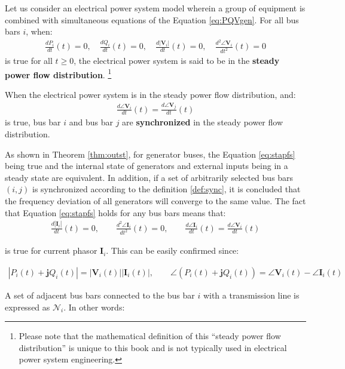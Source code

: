 \documentclass[graybox, envcountchap]{svmult}
\begin{document}
\begin{definition}
\label{def:sync}
Let us consider an electrical power system model wherein a group of equipment is combined with simultaneous equations of the Equation \ref{eq:PQVgen}.
For all bus bars $i$, when:
\begin{align}\label{eq:stapfs}
\frac{dP_i}{dt}(t)=0
,\quad
\frac{dQ_i}{dt}(t)=0
,\quad
\frac{d|\bm{V}_i|}{dt}(t)=0
,\quad
\frac{d^2 \angle \bm{V}_i }{dt^2}(t)=0
\end{align}
is true for all $t\geq0$, the electrical power system is said to be in the \textbf{steady power flow distribution}.
\footnote{
Please note that the mathematical definition of this “steady power flow distribution” is unique to this book and is not typically used in electrical power system engineering.
}

When the electrical power system is in the steady power flow distribution, and:
\begin{align}\label{eq:defsyn}
\frac{d \angle \bm{V}_i}{dt}(t) =  \frac{d \angle \bm{V}_j}{dt}(t)
\end{align}
is true, bus bar $i$ and bus bar $j$ are \textbf{synchronized} in the steady power flow distribution.
\end{definition}

As shown in Theorem \ref{thm:outst}, for generator buses, the Equation \ref{eq:stapfs} being true and the internal state of generators and external inputs being in a steady state are equivalent.
In addition, if a set of arbitrarily selected bus bars $(i,j)$ is synchronized according to the definition \ref{def:sync}, it is concluded that the frequency deviation of all generators will converge to the same value.
The fact that Equation \ref{eq:stapfs} holds for any bus bars means that:
\begin{align*}
\frac{d|\bm{I}_i|}{dt}(t)=0
,\qquad
\frac{d^2 \angle \bm{I}_i }{dt^2}(t)=0
,\qquad
\frac{d \angle \bm{I}_i }{dt}(t) = \frac{d \angle \bm{V}_i }{dt} (t)
\end{align*}

is true for current phasor $\bm{I}_i$.
This can be easily confirmed since:

\begin{align*}
|P_i(t) + \bm{j} Q_i(t)| = |\bm{V}_i(t)| |\bm{I}_i(t)|
,\qquad
\angle(P_i(t) + \bm{j} Q_i(t)) = \angle \bm{V}_i(t) - \angle \bm{I}_i(t)
\end{align*}

A set of adjacent bus bars connected to the bus bar $i$ with a transmission line is expressed as $\mathcal{N}_i$. 
In other words:
\end{document}
